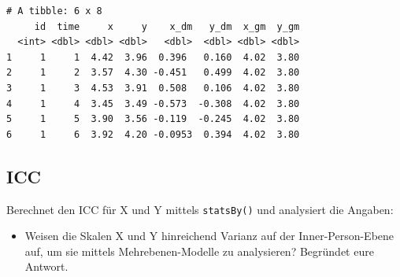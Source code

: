\documentclass[
  letterpaper,
  DIV=11,
  numbers=noendperiod]{scrreprt}
\providecommand{\tightlist}{%
  \setlength{\itemsep}{0pt}\setlength{\parskip}{0pt}}\usepackage{longtable,booktabs,array}
\begin{document}
\begin{verbatim}
# A tibble: 6 x 8
     id  time     x     y    x_dm   y_dm  x_gm  y_gm
  <int> <dbl> <dbl> <dbl>   <dbl>  <dbl> <dbl> <dbl>
1     1     1  4.42  3.96  0.396   0.160  4.02  3.80
2     1     2  3.57  4.30 -0.451   0.499  4.02  3.80
3     1     3  4.53  3.91  0.508   0.106  4.02  3.80
4     1     4  3.45  3.49 -0.573  -0.308  4.02  3.80
5     1     5  3.90  3.56 -0.119  -0.245  4.02  3.80
6     1     6  3.92  4.20 -0.0953  0.394  4.02  3.80
\end{verbatim}

\subsection{ICC}\label{icc}

Berechnet den ICC für X und Y mittels \texttt{statsBy()} und analysiert
die Angaben:

\begin{itemize}
\tightlist
\item
  Weisen die Skalen X und Y hinreichend Varianz auf der
  Inner-Person-Ebene auf, um sie mittels Mehrebenen-Modelle zu
  analysieren? Begründet eure Antwort.
\end{itemize}
\end{document}
